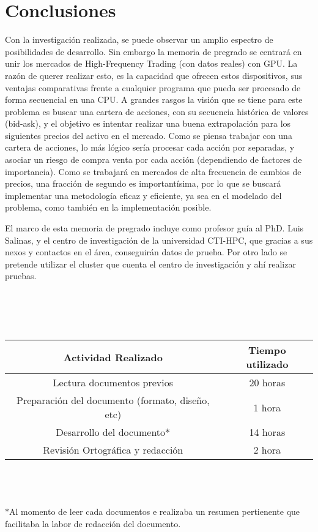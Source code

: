 \section{Conclusiones}
Con la investigación realizada, se puede observar un amplio espectro de posibilidades de desarrollo. Sin embargo la memoria de pregrado se centrará en unir
los mercados de High-Frequency Trading (con datos reales) con GPU. La razón de querer realizar esto, es la capacidad que ofrecen estos dispositivos, sus ventajas
comparativas frente a cualquier programa que pueda ser procesado de forma secuencial en una CPU. A grandes rasgos la visión que se tiene para este problema es buscar
una cartera de acciones, con su secuencia histórica de valores (bid-ask), y el objetivo es intentar realizar una buena extrapolación para los siguientes precios
del activo en el mercado. Como se piensa trabajar con una 
cartera de acciones, lo más lógico sería procesar cada acción por separadas, y asociar un riesgo de compra venta por cada acción (dependiendo de factores de 
importancia). Como se trabajará en mercados de alta frecuencia de cambios de precios, una fracción de segundo es importantísima, por lo que se buscará implementar
una metodología eficaz y eficiente, ya sea en el modelado del problema, como también en la implementación posible.

El marco de esta memoria de pregrado incluye como profesor guía al PhD. Luis Salinas, y el centro de investigación de la universidad CTI-HPC, que gracias a sus nexos
y contactos en el área, conseguirán datos de prueba. Por otro lado se pretende utilizar el cluster que cuenta el centro de investigación y ahí realizar pruebas. \\ \\ \\ \\ \\
\begin{tabular}{|c|c|}
	\hline
	Actividad Realizado & Tiempo utilizado \\
	\hline
	Lectura documentos previos &  20 horas \\
	Preparación del documento (formato, diseño, etc) & 1 hora \\
	Desarrollo del documento$*$ & 14 horas \\
	Revisión Ortográfica y redacción & 2 hora \\
	\hline
\end{tabular}\\ \\ \\
$*$Al momento de leer cada documentos e realizaba un resumen pertienente que facilitaba la labor de redacción del documento.
